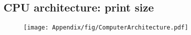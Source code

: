 
\subsection{CPU architecture: print size}
\label{app:ComArch}

\begin{figure}[H]
    \centering
\texttt{[image: Appendix/fig/ComputerArchitecture.pdf]}
    \label{fig:CPUVert}
\end{figure}